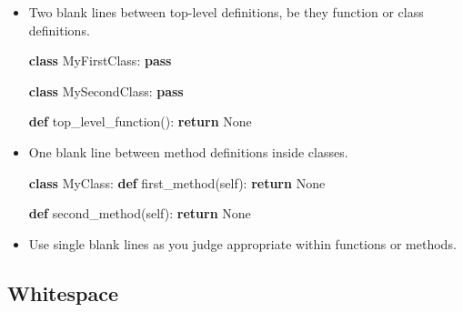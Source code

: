 \documentclass[
]{book}
\newenvironment{Shaded}{\begin{snugshade}}{\end{snugshade}}
\newcommand{\ControlFlowTok}[1]{\textcolor[rgb]{0.13,0.29,0.53}{\textbf{#1}}}
\newcommand{\KeywordTok}[1]{\textcolor[rgb]{0.13,0.29,0.53}{\textbf{#1}}}
\newcommand{\NormalTok}[1]{#1}
\newcommand{\VariableTok}[1]{\textcolor[rgb]{0.00,0.00,0.00}{#1}}
\begin{document}
\begin{itemize}
\item
  Two blank lines between top-level definitions, be they function or class
  definitions.

\begin{Shaded}
\begin{Highlighting}[]
\KeywordTok{class}\NormalTok{ MyFirstClass:}
    \ControlFlowTok{pass}


\KeywordTok{class}\NormalTok{ MySecondClass:}
    \ControlFlowTok{pass}


\KeywordTok{def}\NormalTok{ top_level_function():}
    \ControlFlowTok{return} \VariableTok{None}
\end{Highlighting}
\end{Shaded}
\item
  One blank line between method definitions inside classes.

\begin{Shaded}
\begin{Highlighting}[]
\KeywordTok{class}\NormalTok{ MyClass:}
    \KeywordTok{def}\NormalTok{ first_method(}\VariableTok{self}\NormalTok{):}
        \ControlFlowTok{return} \VariableTok{None}

    \KeywordTok{def}\NormalTok{ second_method(}\VariableTok{self}\NormalTok{):}
        \ControlFlowTok{return} \VariableTok{None}
\end{Highlighting}
\end{Shaded}
\item
  Use single blank lines as you judge appropriate within functions or methods.
\end{itemize}

\hypertarget{whitespace}{%
\subsection{Whitespace}\label{whitespace}}
\end{document}
